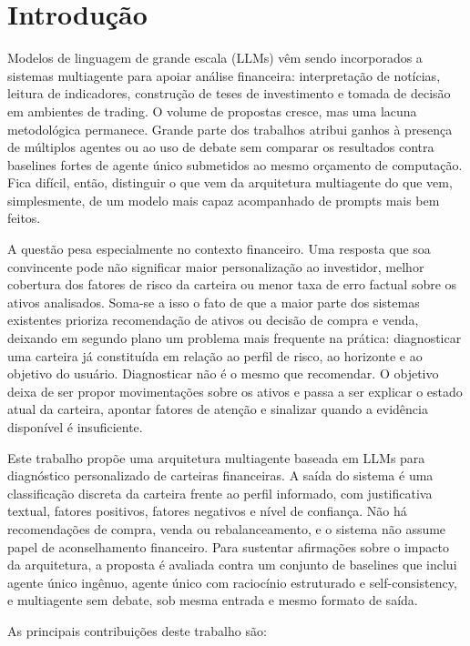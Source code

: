 \section{Introdução}
\label{sec:intro}

Modelos de linguagem de grande escala (LLMs) vêm sendo incorporados a sistemas
multiagente para apoiar análise financeira: interpretação de notícias, leitura
de indicadores, construção de teses de investimento e tomada de decisão em
ambientes de trading. O volume de propostas cresce, mas uma lacuna
metodológica permanece. Grande parte dos trabalhos atribui ganhos à presença
de múltiplos agentes ou ao uso de debate sem comparar os resultados contra
baselines fortes de agente único submetidos ao mesmo orçamento de
computação. Fica difícil, então, distinguir o que vem da arquitetura
multiagente do que vem, simplesmente, de um modelo mais capaz acompanhado
de prompts mais bem feitos.

A questão pesa especialmente no contexto financeiro. Uma resposta que soa
convincente pode não significar maior personalização ao investidor, melhor
cobertura dos fatores de risco da carteira ou menor taxa de erro factual
sobre os ativos analisados. Soma-se a isso o fato de que a maior parte dos
sistemas existentes prioriza recomendação de ativos ou decisão de compra e
venda, deixando em segundo plano um problema mais frequente na prática:
diagnosticar uma carteira já constituída em relação ao perfil de risco, ao
horizonte e ao objetivo do usuário. Diagnosticar não é o mesmo que
recomendar. O objetivo deixa de ser propor movimentações sobre os ativos e
passa a ser explicar o estado atual da carteira, apontar fatores de
atenção e sinalizar quando a evidência disponível é insuficiente.

Este trabalho propõe uma arquitetura multiagente baseada em LLMs para
diagnóstico personalizado de carteiras financeiras. A saída do sistema é
uma classificação discreta da carteira frente ao perfil informado, com
justificativa textual, fatores positivos, fatores negativos e nível de
confiança. Não há recomendações de compra, venda ou rebalanceamento, e o
sistema não assume papel de aconselhamento financeiro. Para sustentar
afirmações sobre o impacto da arquitetura, a proposta é avaliada contra um
conjunto de baselines que inclui agente único ingênuo, agente único com
raciocínio estruturado e self-consistency, e multiagente sem debate, sob
mesma entrada e mesmo formato de saída.

As principais contribuições deste trabalho são:

